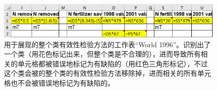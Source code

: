 \begin{figure}[tp]
    \centering
    \includegraphics[width=\columnwidth]{figure/figure4.png}
    \caption{用于展现\wa 的整个类有效性检验方法的工作表``World 1996''。\cu 识别出了一个类（用花色标记出来，但整个类是不合理的），进而导致所有相关的单元格都被错误地标记为有缺陷的（用红色三角形标记），不过这个类会被\wa 的整个类的有效性检验方法移除掉，进而相关的所有单元格也不会被错误地标记为有缺陷的。}
    \label{figure4}
\end{figure}